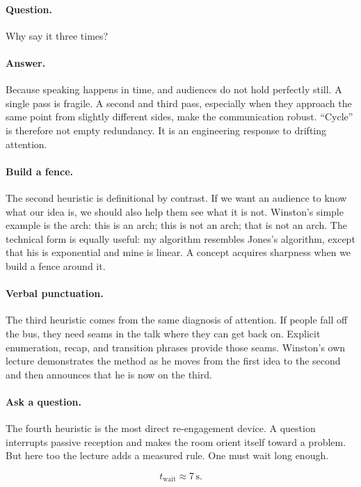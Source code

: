 \paragraph{Question.} Why say it three times?

\paragraph{Answer.} Because speaking happens in time, and audiences do not hold perfectly still. A single pass is fragile. A second and third pass, especially when they approach the same point from slightly different sides, make the communication robust. ``Cycle'' is therefore not empty redundancy. It is an engineering response to drifting attention.

\paragraph{Build a fence.} The second heuristic is definitional by contrast. If we want an audience to know what our idea is, we should also help them see what it is not. Winston's simple example is the arch: this is an arch; this is not an arch; that is not an arch. The technical form is equally useful: my algorithm resembles Jones's algorithm, except that his is exponential and mine is linear. A concept acquires sharpness when we build a fence around it.

\paragraph{Verbal punctuation.} The third heuristic comes from the same diagnosis of attention. If people fall off the bus, they need seams in the talk where they can get back on. Explicit enumeration, recap, and transition phrases provide those seams. Winston's own lecture demonstrates the method as he moves from the first idea to the second and then announces that he is now on the third.

\paragraph{Ask a question.} The fourth heuristic is the most direct re-engagement device. A question interrupts passive reception and makes the room orient itself toward a problem. But here too the lecture adds a measured rule. One must wait long enough.

\begin{equation}
t_{\mathrm{wait}} \approx 7\,\mathrm{s}.
\end{equation}


